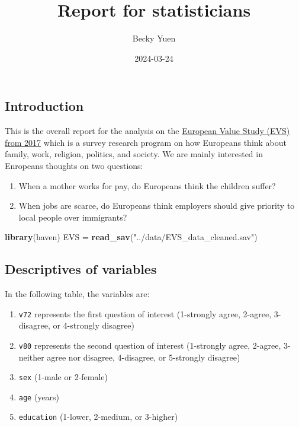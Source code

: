 \documentclass[
]{article}
\title{Report for statisticians}
\author{Becky Yuen}
\date{2024-03-24}
\newenvironment{Shaded}{\begin{snugshade}}{\end{snugshade}}
\newcommand{\FunctionTok}[1]{\textcolor[rgb]{0.13,0.29,0.53}{\textbf{#1}}}
\newcommand{\NormalTok}[1]{#1}
\newcommand{\OtherTok}[1]{\textcolor[rgb]{0.56,0.35,0.01}{#1}}
\newcommand{\StringTok}[1]{\textcolor[rgb]{0.31,0.60,0.02}{#1}}
\providecommand{\tightlist}{%
  \setlength{\itemsep}{0pt}\setlength{\parskip}{0pt}}
\begin{document}
\maketitle

\hypertarget{introduction}{%
\subsection{Introduction}\label{introduction}}

This is the overall report for the analysis on the
\href{https://search.gesis.org/research_data/ZA7500}{European Value
Study (EVS) from 2017} which is a survey research program on how
Europeans think about family, work, religion, politics, and society. We
are mainly interested in Enropeans thoughts on two questions:

\begin{enumerate}
\def\labelenumi{\arabic{enumi}.}
\tightlist
\item
  When a mother works for pay, do Europeans think the children suffer?
\item
  When jobs are scarce, do Europeans think employers should give
  priority to local people over immigrants?
\end{enumerate}

\begin{Shaded}
\begin{Highlighting}[]
\FunctionTok{library}\NormalTok{(haven)}
\NormalTok{EVS }\OtherTok{=} \FunctionTok{read\_sav}\NormalTok{(}\StringTok{"../data/EVS\_data\_cleaned.sav"}\NormalTok{)}
\end{Highlighting}
\end{Shaded}

\hypertarget{descriptives-of-variables}{%
\subsection{Descriptives of variables}\label{descriptives-of-variables}}

In the following table, the variables are:

\begin{enumerate}
\def\labelenumi{\arabic{enumi}.}
\tightlist
\item
  \texttt{v72} represents the first question of interest (1-strongly
  agree, 2-agree, 3-disagree, or 4-strongly disagree)
\item
  \texttt{v80} represents the second question of interest (1-strongly
  agree, 2-agree, 3-neither agree nor disagree, 4-disagree, or
  5-strongly disagree)
\item
  \texttt{sex} (1-male or 2-female)
\item
  \texttt{age} (years)
\item
  \texttt{education} (1-lower, 2-medium, or 3-higher)
\end{enumerate}
\end{document}
